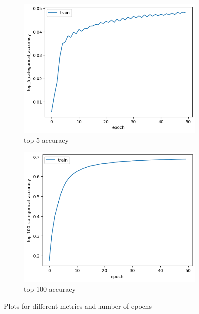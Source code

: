 \documentclass[11pt]{article}
\begin{document}
  \begin{figure}[H]
    \centering
    \begin{subfigure}[b]{.45\textwidth}
        \includegraphics[width=\textwidth]{image/top5accuracy.png}
        \caption{top 5 accuracy}
    \end{subfigure}
    \hfill
    \begin{subfigure}[b]{.45\textwidth}
        \includegraphics[width=\textwidth]{image/top100accuracy.png}
        \caption{top 100 accuracy}
    \end{subfigure}
    \caption{Plots for different metrics and number of epochs}
  \end{figure}
\end{document}
